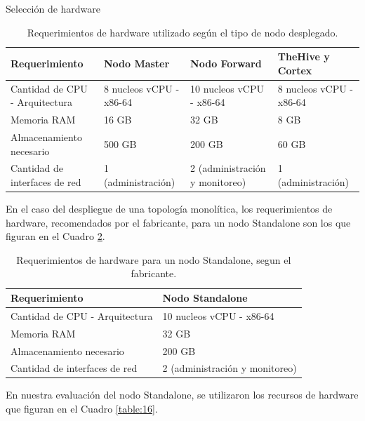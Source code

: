 \begin{section}{Selección de hardware}
        \begin{table}[H]
        \centering
        \begin{tabular}{|m{9em}|m{9em}|m{9em}|m{9em}|}
        
            \hline 
                Requerimiento  & Nodo Master &  Nodo Forward & TheHive y Cortex \\ 
            \hline
                Cantidad de CPU - Arquitectura & 8 nucleos vCPU - x86-64 & 10 nucleos vCPU - x86-64 & 8 nucleos vCPU - x86-64 \\ 
            \hline
                Memoria RAM  & 16 GB & 32 GB & 8 GB \\ 
            \hline
                Almacenamiento necesario & 500 GB  & 200 GB & 60 GB \\
            \hline
        Cantidad de interfaces de red & 1 (administración) & 2 (administración y monitoreo) & 1 (administración) \\
            \hline %
        \end{tabular}
        \caption{Requerimientos de hardware utilizado según el tipo de nodo desplegado.}
        \label{table:12}
        \end{table}
        \FloatBarrier
        En el caso del despliegue de una topología monolítica, los requerimientos de hardware, recomendados por el fabricante, para un nodo Standalone son los que figuran en el Cuadro \ref{table:15}. \par 
        
         \begin{table}[H]
        \centering
        \begin{tabular}{|m{10em}|m{10em}|}
        
            \hline 
                Requerimiento  & Nodo Standalone \\ 
            \hline
                Cantidad de CPU - Arquitectura &  10 nucleos vCPU - x86-64  \\ 
            \hline
                Memoria RAM  &  32 GB  \\ 
            \hline
                Almacenamiento necesario   & 200 GB  \\
            \hline
        Cantidad de interfaces de red  & 2 (administración y monitoreo) \\
            \hline %
        \end{tabular}
        \caption{Requerimientos de hardware para un nodo Standalone, segun el fabricante.}
        \label{table:15}
        \end{table}
        \FloatBarrier 
        En nuestra evaluación del nodo Standalone, se utilizaron los recursos de hardware que figuran en el Cuadro \ref{table:16}.
        \begin{table}[H]
        \centering
        \begin{tabular}{|m{10em}|m{10em}|}
        

\end{tabular}
\end{table}
\end{section}
